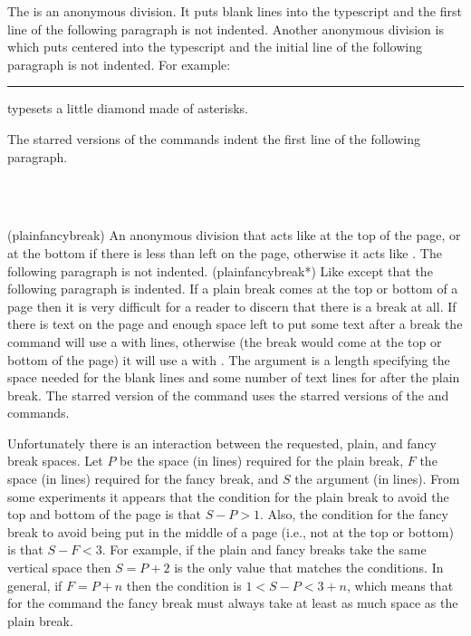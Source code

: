     The \cmd{\plainbreak} is an anonymous division. It puts 
blank lines into the typescript and the first line of the following
paragraph is not indented. Another anonymous
division is \cmd{\fancybreak} which puts  centered into the
typescript and the initial line of the following paragraph is not
indented. For
example:
\begin{lcode}
\fancybreak{{*}\\{* * *}\\{*}}
\end{lcode}
typesets a little diamond made of asterisks.

    The starred versions of the commands indent the first line of the
following paragraph.

\begin{syntax}
\cmd{\plainfancybreak} \\
\cmd{\plainfancybreak*} \\
\end{syntax}
\glossary(plainfancybreak)%
  {}%
  {An anonymous division that acts like  at the top
   of the page, or at the bottom if there is less than 
   left on the page, otherwise it acts like .
   The following paragraph is not indented.}
\glossary(plainfancybreak*)%
  {}%
  {Like  except that the following paragraph is indented.}
If a plain break comes at the top or bottom of a page then it is very
difficult for a reader to discern that there is a break at all.
If there is text on the page and enough space left to put some text
after a break the \cmd{\plainfancybreak} command will use a \cmd{\plainbreak}
with  lines,
otherwise (the break would come at the top or bottom of the page) it
will use a \cmd{\fancybreak} with . The  argument is a
length specifying the space needed for the  blank lines and some
number of text lines for after the plain break. The starred version of
the command uses the starred versions of the \cmd{\plainbreak} and
\cmd{\fancybreak} commands.


    Unfortunately there is an interaction between the requested, plain,
and fancy break spaces.
    Let $P$ be the space (in lines) required for the plain break,
$F$ the space (in lines)
required for the fancy break, and $S$ the  argument (in lines).
From some experiments it appears that the condition for the plain break
to avoid the top and bottom of the page is that $S - P > 1$.
Also, the condition for the fancy break to avoid being put in the middle
of a page (i.e., not at the top or bottom) is that  $S - F < 3$.
For example, if the plain and fancy breaks take the same vertical space
then $S = P +2$ is the only value that matches the conditions. In general,
if $F = P + n$ then the condition is $1 < S-P < 3+n$, which means that
for the \cmd{\plainfancybreak} command the
fancy break must always take at least as much space as the plain break.


